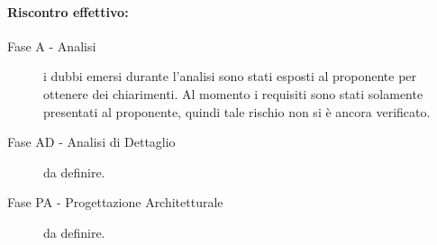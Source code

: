 \documentclass[../PianoProgetto.tex]{subfiles}
\begin{document}
	\paragraph*{Riscontro effettivo:}
		\begin{description}
			\item[Fase A - Analisi] i dubbi emersi durante l'analisi sono stati esposti al proponente per ottenere dei chiarimenti. Al momento i requisiti sono stati solamente presentati al proponente, quindi tale rischio non si è ancora verificato.
			\item[Fase AD - Analisi di Dettaglio] da definire.
			\item[Fase PA - Progettazione Architetturale] da definire.
		\end{description}

			
\end{document}
